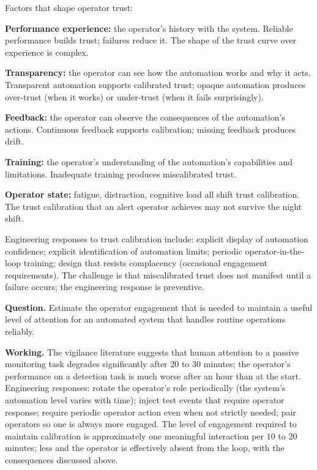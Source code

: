 Factors that shape operator trust:

\textbf{Performance experience:} the operator's history with the system. Reliable performance builds trust; failures reduce it. The shape of the trust curve over experience is complex.

\textbf{Transparency:} the operator can see how the automation works and why it acts. Transparent automation supports calibrated trust; opaque automation produces over-trust (when it works) or under-trust (when it fails surprisingly).

\textbf{Feedback:} the operator can observe the consequences of the automation's actions. Continuous feedback supports calibration; missing feedback produces drift.

\textbf{Training:} the operator's understanding of the automation's capabilities and limitations. Inadequate training produces miscalibrated trust.

\textbf{Operator state:} fatigue, distraction, cognitive load all shift trust calibration. The trust calibration that an alert operator achieves may not survive the night shift.

Engineering responses to trust calibration include: explicit display of automation confidence; explicit identification of automation limits; periodic operator-in-the-loop training; design that resists complacency (occasional engagement requirements). The challenge is that miscalibrated trust does not manifest until a failure occurs; the engineering response is preventive.

\begin{estimation}
\textbf{Question.} Estimate the operator engagement that is needed to maintain a useful level of attention for an automated system that handles routine operations reliably.

\textbf{Working.} The vigilance literature suggests that human attention to a passive monitoring task degrades significantly after $20$ to $30$ minutes; the operator's performance on a detection task is much worse after an hour than at the start. Engineering responses: rotate the operator's role periodically (the system's automation level varies with time); inject test events that require operator response; require periodic operator action even when not strictly needed; pair operators so one is always more engaged. The level of engagement required to maintain calibration is approximately one meaningful interaction per $10$ to $20$ minutes; less and the operator is effectively absent from the loop, with the consequences discussed above.
\end{estimation}

